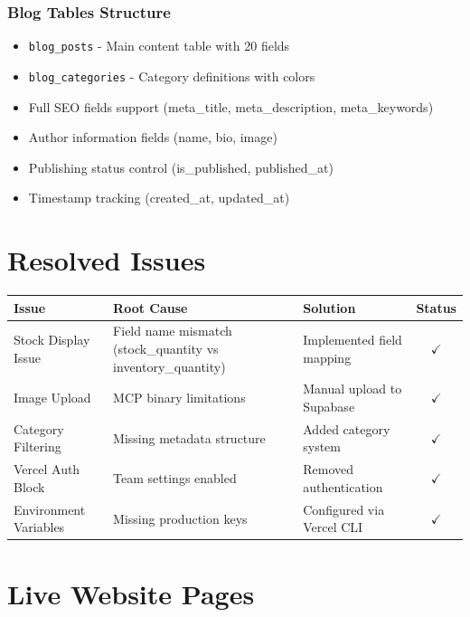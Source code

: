 \documentclass[11pt,a4paper]{article}
\newcommand{\mycheck}{\textcolor{ispeak-green}{\textbf{$\checkmark$}}}
\begin{document}
\subsubsection{Blog Tables Structure}

\begin{tcolorbox}[colback=gray!5, colframe=ispeak-gray]
\begin{itemize}[leftmargin=*, label=•]
    \item \texttt{blog\_posts} - Main content table with 20 fields
    \item \texttt{blog\_categories} - Category definitions with colors
    \item Full SEO fields support (meta\_title, meta\_description, meta\_keywords)
    \item Author information fields (name, bio, image)
    \item Publishing status control (is\_published, published\_at)
    \item Timestamp tracking (created\_at, updated\_at)
\end{itemize}
\end{tcolorbox}

\section{Resolved Issues}

\begin{tabularx}{\textwidth}{|X|X|X|c|}
\hline
\rowcolor{header-bg!10}
\textbf{Issue} & \textbf{Root Cause} & \textbf{Solution} & \textbf{Status} \\
\hline
Stock Display Issue & Field name mismatch (stock\_quantity vs inventory\_quantity) & Implemented field mapping & \mycheck \\
\hline
Image Upload & MCP binary limitations & Manual upload to Supabase & \mycheck \\
\hline
Category Filtering & Missing metadata structure & Added category system & \mycheck \\
\hline
Vercel Auth Block & Team settings enabled & Removed authentication & \mycheck \\
\hline
Environment Variables & Missing production keys & Configured via Vercel CLI & \mycheck \\
\hline
\end{tabularx}

\newpage

\section{Live Website Pages}
\end{document}
